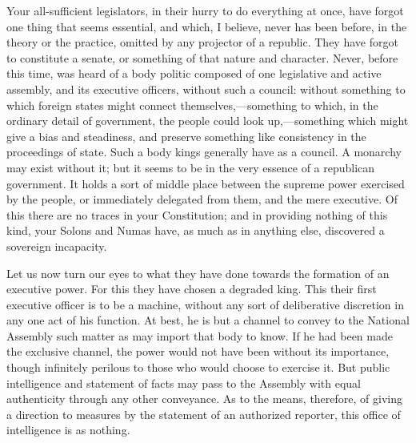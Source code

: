 Your all-sufficient legislators, in their hurry to do everything at once, have forgot one thing that seems essential, and which, I believe, never has been before, in the theory or the practice, omitted by any projector of a republic. They have forgot to constitute a senate, or something of that nature and character. Never, before this time, was heard of a body politic composed of one legislative and active assembly, and its executive officers, without such a council: without something to which foreign states might connect themselves,—something to which, in the ordinary detail of government, the people could look up,—something which might give a bias and steadiness, and preserve something like consistency in the proceedings of state. Such a body kings generally have as a council. A monarchy may exist without it; but it seems to be in the very essence of a republican government. It holds a sort of middle place between the supreme power exercised by the people, or immediately delegated from them, and the mere executive. Of this there are no traces in your Constitution; and in providing nothing of this kind, your Solons and Numas have, as much as in anything else, discovered a sovereign incapacity.

Let us now turn our eyes to what they have done towards the formation of an executive power. For this they have chosen a degraded king. This their first executive officer is to be a machine, without any sort of deliberative discretion in any one act of his function. At best, he is but a channel to convey to the National Assembly such matter as may import that body to know. If he had been made the exclusive channel, the power would not have been without its importance, though infinitely perilous to those who would choose to exercise it. But public intelligence and statement of facts may pass to the Assembly with equal authenticity through any other conveyance. As to the means, therefore, of giving a direction to measures by the statement of an authorized reporter, this office of intelligence is as nothing.

